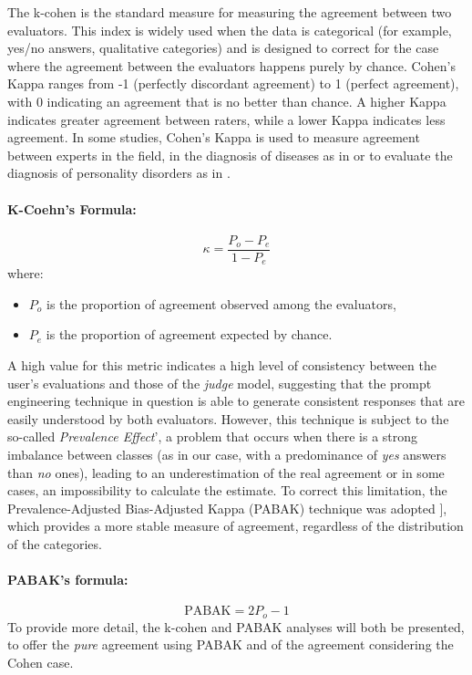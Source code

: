 The k-cohen is the standard measure for measuring the agreement between two evaluators. This index is widely used when the data is categorical (for example, yes/no answers, qualitative categories) and is designed to correct for the case where the agreement between the evaluators happens purely by chance. Cohen's Kappa ranges from -1 (perfectly discordant agreement) to 1 (perfect agreement), with 0 indicating an agreement that is no better than chance. A higher Kappa indicates greater agreement between raters, while a lower Kappa indicates less agreement.
In some studies, Cohen's Kappa is used to measure agreement between experts in the field, in the diagnosis of diseases as in \cite{wongpakaran2013comparison} or to evaluate the diagnosis of personality disorders as in \cite{luciano2019field}.\\
\paragraph{K-Coehn's Formula:} 
\[
\kappa = \frac{P_o - P_e}{1 - P_e}
\]
where:
\begin{itemize}
    \item \(P_o\) is the proportion of agreement observed among the evaluators,
    \item \(P_e\) is the proportion of agreement expected by chance.
\end{itemize}
A high value for this metric indicates a high level of consistency between the user's evaluations and those of the \textit{judge} model, suggesting that the prompt engineering technique in question is able to generate consistent responses that are easily understood by both evaluators.
However, this technique is subject to the so-called \textit{Prevalence Effect}’, a problem that occurs when there is a strong imbalance between classes (as in our case, with a predominance of \textit{yes} answers than \textit{no} ones), leading to an underestimation of the real agreement \cite{ricci2020sperimentazione} or in some cases, an impossibility to calculate the estimate.
To correct this limitation, the Prevalence-Adjusted Bias-Adjusted Kappa (PABAK) technique was adopted ], which provides a more stable measure of agreement, regardless of the distribution of the categories.
\paragraph{PABAK's formula: }
\[
\text{PABAK} = 2P_o - 1
\]
To provide more detail, the k-cohen and PABAK analyses will both be presented, to offer the \textit{pure} agreement using PABAK and of the agreement considering the Cohen case.
